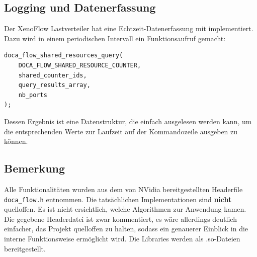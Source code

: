 \subsection{Logging und Datenerfassung}
Der XenoFlow Lastverteiler hat eine Echtzeit-Datenerfassung mit implementiert. Dazu wird in einem periodischen Intervall ein Funktionsaufruf gemacht:
\begin{verbatim}
doca_flow_shared_resources_query(
    DOCA_FLOW_SHARED_RESOURCE_COUNTER,
    shared_counter_ids,
    query_results_array,
    nb_ports
);
\end{verbatim}
 Dessen Ergebnis ist eine Datenstruktur, die einfach ausgelesen werden kann, um die entsprechenden Werte zur Laufzeit auf der Kommandozeile ausgeben zu können.

\subsection{Bemerkung}
Alle Funktionalitäten wurden aus dem von NVidia bereitgestellten Headerfile\texttt{ doca\_flow.h} entnommen. Die tatsächlichen Implementationen sind \textbf{nicht} quelloffen. Es ist nicht ersichtlich, welche Algorithmen zur Anwendung kamen. Die gegebene Headerdatei ist zwar kommentiert, es wäre allerdings deutlich einfacher, das Projekt quelloffen zu halten, sodass ein genauerer Einblick in die interne Funktionsweise ermöglicht wird. Die Libraries werden als .so-Dateien bereitgestellt.